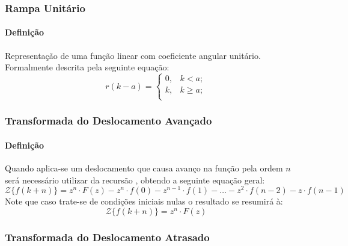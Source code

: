 \documentclass{article}
\begin{document}
\subsubsection{Rampa Unitário}
    \paragraph{Definição}Representação de uma função linear com coeficiente angular unitário. Formalmente descrita pela seguinte equação:
    \begin{equation}
        \boxed{
            r(k - a) = 
            \begin{cases}
                0, & k < a;\\
                k, & k \ge a;\\
            \end{cases}
        }
    \end{equation}

\subsubsection{Transformada do Deslocamento Avançado}
    \paragraph{Definição}Quando aplica-se um deslocamento que causa avanço na função pela ordem $n$ será necessário utilizar da recursão , obtendo a seguinte equação geral:
    \begin{equation}
        \boxed{
            \mathcal{Z}\{ f(k+n) \} = 
            z^{n}\cdot F(z) - 
            z^{n} \cdot f(0) - 
            z^{n-1} \cdot f(1) - \dots - 
            z^{2} \cdot f(n-2) - 
            z\cdot f(n-1)
        }
    \end{equation}
    Note que caso trate-se de condições iniciais nulas o resultado se resumirá à:
    \begin{equation*}
        \mathcal{Z}\{ f(k+n) \} = 
        z^{n}\cdot F(z)
    \end{equation*}

\subsubsection{Transformada do Deslocamento Atrasado}
\end{document}
